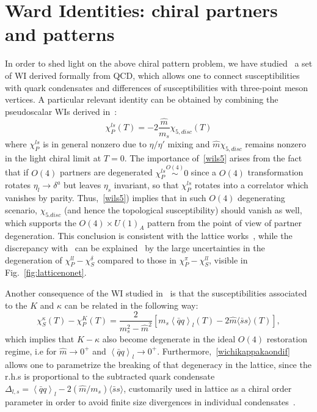 \documentclass{PoS}
\newcommand{\eqchiral}{\!\stackrel{O(4)}{\sim}\!}
\newcommand{\condl}{\mean{\bar q q}_l}
\newcommand{\conds}{\langle \bar s s \rangle}
\newcommand{\mean}[1]{\left\langle{#1}\right\rangle}
\begin{document}
\section{Ward Identities: chiral partners and patterns}
In order to shed light on the above chiral pattern problem, we have studied~\cite{GomezNicola:2017bhm} a set of WI derived formally from QCD, 
which allows one to connect susceptibilities with quark condensates and differences of susceptibilities with three-point meson vertices.  
A particular relevant identity can be obtained by combining the pseudoscalar WIs  derived in~\cite{Nicola:2016jlj}:
\begin{equation}
\chi_P^{ls}(T)=-2\frac{\hat m}{m_s} \chi_{5,disc}(T)
\label{wils5}
\end{equation}
where $\chi_P^{ls}$ is in general nonzero due to $\eta/\eta'$ mixing and $\hat m \chi_{5,disc}$ remains nonzero in the light chiral limit at $T=0$. 
The importance of~\eqref{wils5} arises from the fact that if $O(4)$ partners are degenerated $\chi_P^{ls}\eqchiral 0$ since a $O(4)$ transformation rotates $\eta_l\rightarrow \delta^a$ but leaves $\eta_s$ invariant, 
so that $\chi_P^{ls}$ rotates into a correlator which vanishes by parity. Thus,~\eqref{wils5}) implies that in such $O(4)$ degenerating scenario, $\chi_{5.disc}$ (and hence the topological susceptibility) should vanish as well, 
which supports the $O(4)\times U(1)_A$ pattern from the point of view of partner degeneration. This conclusion is consistent with the lattice works~\cite{Aoki:2012yj,Cossu:2013uua,Tomiya:2016jwr,Brandt:2016daq}, 
while the discrepancy with~\cite{Buchoff:2013nra} can be explained~\cite{GomezNicola:2017bhm} by the large uncertainties in the degeneration of $\chi_P^{ll}-\chi_S^\delta$ compared to those in $\chi_P^{\pi}-\chi_S^{ll}$,  
visible in Fig.~\ref{fig:latticenonet}. 


Another consequence of the WI studied in~\cite{GomezNicola:2017bhm} is that the susceptibilities associated to the $K$ and $\kappa$ can be related in the following way:
\begin{equation}
  \chi_S^\kappa (T)-\chi_P^K (T)=\frac{2}{m_s^2-\hat m^2}\left[m_s\condl (T)-2\hat m \conds (T)\right],
  \label{wichikappakaondif}
\end{equation}
which implies that $K-\kappa$ also become degenerate in the ideal $O(4)$ restoration regime, i.e for $\hat m\rightarrow 0^+$ and $\condl\rightarrow 0^+$. 
Furthermore,~\eqref{wichikappakaondif} allows one to parametrize the breaking of that degeneracy in the lattice, since the r.h.s is proportional to the subtracted quark condensate $\Delta_{l,s}=\condl-2(\hat m/m_s)\conds$, 
customarily used in lattice as a chiral order parameter in order to avoid finite size divergences in individual condensates~\cite{Aoki:2009sc,Bazavov:2011nk,Buchoff:2013nra}.
\end{document}
